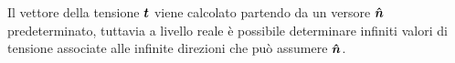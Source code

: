 	Il vettore della tensione $\boldsymbol{t}$ viene calcolato partendo da un versore $\boldsymbol{\hat{n}}$ predeterminato, tuttavia a livello reale è possibile determinare infiniti valori di tensione associate alle infinite direzioni che può assumere $\boldsymbol{\hat{n}}$.
	
	
	
	
	
	
	
	
	
	
	
	
	
	
	
	
	
	
	
	
	
	
	
	
	
	
	
	
	
	
	
	